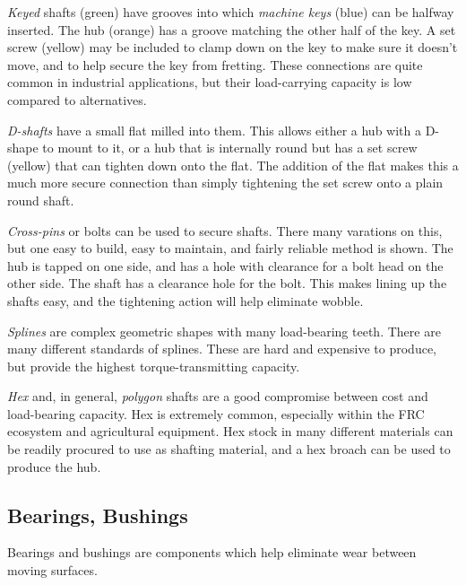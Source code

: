 \documentclass[10pt,letterpaper]{book}
\begin{document}
	\begin{asparaenum}[a)]
		\item \textit{Keyed} shafts (green) have grooves into which \textit{machine keys} (blue) can be halfway inserted. The hub (orange) has a groove matching the other half of the key. A set screw (yellow) may be included to clamp down on the key to make sure it doesn't move, and to help secure the key from fretting. These connections are quite common in industrial applications, but their load-carrying capacity is low compared to alternatives.
		\item \textit{D-shafts} have a small flat milled into them. This allows either a hub with a D-shape to mount to it, or a hub that is internally round but has a set screw (yellow) that can tighten down onto the flat. The addition of the flat makes this a much more secure connection than simply tightening the set screw onto a plain round shaft.
		\item \textit{Cross-pins} or bolts can be used to secure shafts. There many varations on this, but one easy to build, easy to maintain, and fairly reliable method is shown. The hub is tapped on one side, and has a hole with clearance for a bolt head on the other side. The shaft has a clearance hole for the bolt. This makes lining up the shafts easy, and the tightening action will help eliminate wobble.
		\item \textit{Splines} are complex geometric shapes with many load-bearing teeth. There are many different standards of splines. These are hard and expensive to produce, but provide the highest torque-transmitting capacity.
		\item \textit{Hex} and, in general, \textit{polygon} shafts are a good compromise between cost and load-bearing capacity. Hex is extremely common, especially within the FRC ecosystem and agricultural equipment. Hex stock in many different materials can be readily procured to use as shafting material, and a hex broach can be used to produce the hub.
	\end{asparaenum}
	
\subsection{Bearings, Bushings}

	Bearings and bushings are components which help eliminate wear between moving surfaces.
\end{document}
